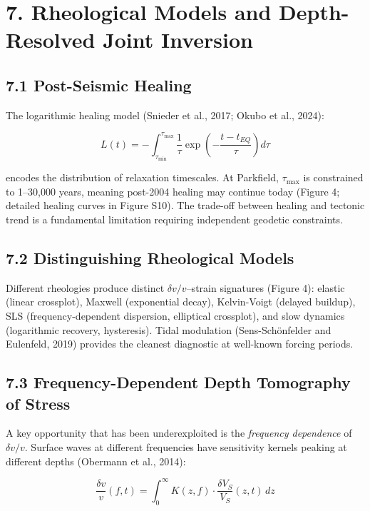 \documentclass[12pt]{article}
\begin{document}
\section{7. Rheological Models and Depth-Resolved Joint
Inversion}\label{rheological-models-and-depth-resolved-joint-inversion}

\subsection{7.1 Post-Seismic Healing}\label{post-seismic-healing}

The logarithmic healing model (Snieder et al., 2017; Okubo et al.,
2024):

\[L(t) = -\int_{\tau_{\min}}^{\tau_{\max}} \frac{1}{\tau} \exp\left(-\frac{t - t_{EQ}}{\tau}\right) d\tau \tag{12}\]

encodes the distribution of relaxation timescales. At Parkfield,
\(\tau_{\max}\) is constrained to 1--30,000 years, meaning post-2004
healing may continue today (Figure 4; detailed healing curves in Figure
S10). The trade-off between healing and tectonic trend is a fundamental
limitation requiring independent geodetic constraints.

\subsection{7.2 Distinguishing Rheological
Models}\label{distinguishing-rheological-models}

Different rheologies produce distinct \(\delta v/v\)--strain signatures
(Figure 4): elastic (linear crossplot), Maxwell (exponential decay),
Kelvin-Voigt (delayed buildup), SLS (frequency-dependent dispersion,
elliptical crossplot), and slow dynamics (logarithmic recovery,
hysteresis). Tidal modulation (Sens-Schönfelder and Eulenfeld, 2019)
provides the cleanest diagnostic at well-known forcing periods.

\subsection{7.3 Frequency-Dependent Depth Tomography of
Stress}\label{frequency-dependent-depth-tomography-of-stress}

A key opportunity that has been underexploited is the \emph{frequency
dependence} of \(\delta v/v\). Surface waves at different frequencies
have sensitivity kernels peaking at different depths (Obermann et al.,
2014):

\[\frac{\delta v}{v}(f, t) = \int_0^\infty K(z, f) \cdot \frac{\delta V_S}{V_S}(z, t) \, dz \tag{13}\]
\end{document}
